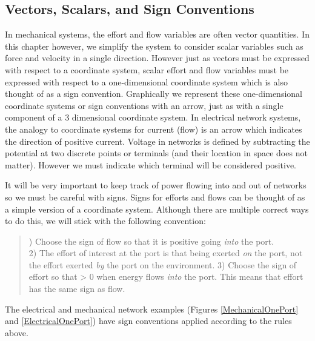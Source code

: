 \subsection{Vectors, Scalars, and Sign Conventions}\label{Signs}

 In mechanical systems, the effort and flow variables are often vector quantities.  In this chapter however, we simplify the system to consider scalar variables such as force and velocity in a single direction.  However just as vectors must be expressed with respect to a coordinate system, scalar effort and flow variables must be expressed with respect to a one-dimensional coordinate system which is also thought of as a sign convention.   Graphically we represent these one-dimensional coordinate systems or sign conventions with an arrow, just as with a single component of a 3 dimensional coordinate system.  In electrical network systems, the analogy to coordinate systems for current (flow) is an arrow which indicates the direction of positive current.    Voltage in networks is defined by subtracting the potential at two discrete points or terminals (and their location in space does not matter).  However we must indicate which terminal will be considered positive. 	%

It will be very important to keep track of power flowing into and out of networks so we must be careful with signs.   Signs for efforts and flows can be thought of as a simple version of a coordinate system.   Although there are multiple correct ways to do this, we will stick with the following convention:	%

\begin{quotation}
) Choose the sign of flow so that it is positive going {\it into} the port. \\
2) The effort of interest at the port is that being exerted {\it on} the port, not the effort exerted {\it by} the port on the environment.
3) Choose the sign of effort so that
\bq
\ef \times \fl > 0
\eq
when energy flows {\it into} the port.  This means that effort has the same sign as flow.
\end{quotation}

The electrical and mechanical network examples (Figures \ref{MechanicalOnePort} and \ref{ElectricalOnePort}) have sign conventions applied according to the rules above. 	%



